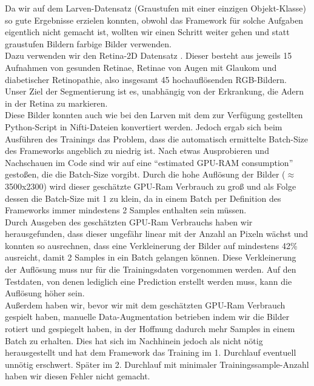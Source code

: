 Da wir auf dem Larven-Datensatz (Graustufen mit einer einzigen Objekt-Klasse) so gute Ergebnisse erzielen konnten, obwohl das Framework für solche Aufgaben eigentlich nicht gemacht ist, wollten wir einen Schritt weiter gehen und statt graustufen Bildern farbige Bilder verwenden.\\
Dazu verwenden wir den Retina-2D Datensatz \cite{retina2d}. Dieser besteht aus jeweils 15 Aufnahmen von gesunden Retinae, Retinae von Augen mit Glaukom und diabetischer Retinopathie, also insgesamt 45 hochauflösenden RGB-Bildern. Unser Ziel der Segmentierung ist es, unabhängig von der Erkrankung, die Adern in der Retina zu markieren.\\
Diese Bilder konnten auch wie bei den Larven mit dem zur Verfügung gestellten Python-Script \cite{nnunetGithub2D-Pythonscript} in Nifti-Dateien konvertiert werden. Jedoch ergab sich beim Ausführen des Trainings das Problem, dass die automatisch ermittelte Batch-Size des Frameworks angeblich zu niedrig ist. Nach etwas Ausprobieren und Nachschauen im Code sind wir auf eine \enquote{estimated GPU-RAM consumption} \cite{nnunetGithub} gestoßen, die die Batch-Size vorgibt. Durch die hohe Auflösung der Bilder ($\approx$ 3500x2300) wird dieser geschätzte GPU-Ram Verbrauch zu groß und als Folge dessen die Batch-Size mit 1 zu klein, da in einem Batch per Definition des Frameworks immer mindestens 2 Samples enthalten sein müssen.\\
Durch Ausgeben des geschätzten GPU-Ram Verbrauchs haben wir herausgefunden, dass dieser ungefähr linear mit der Anzahl an Pixeln wächst und konnten so ausrechnen, dass eine Verkleinerung der Bilder auf mindestens 42\% ausreicht, damit 2 Samples in ein Batch gelangen können.
Diese Verkleinerung der Auflösung muss nur für die Trainingsdaten vorgenommen werden. Auf den Testdaten, von denen lediglich eine Prediction erstellt werden muss, kann die Auflösung höher sein.\\
Außerdem haben wir, bevor wir mit dem geschätzten GPU-Ram Verbrauch gespielt haben, manuelle Data-Augmentation betrieben indem wir die Bilder rotiert und gespiegelt haben, in der Hoffnung dadurch mehr Samples in einem Batch zu erhalten. Dies hat sich im Nachhinein jedoch als nicht nötig herausgestellt und hat dem Framework das Training im 1. Durchlauf eventuell unnötig erschwert. Später im 2. Durchlauf mit minimaler Trainingssample-Anzahl haben wir diesen Fehler nicht gemacht.



